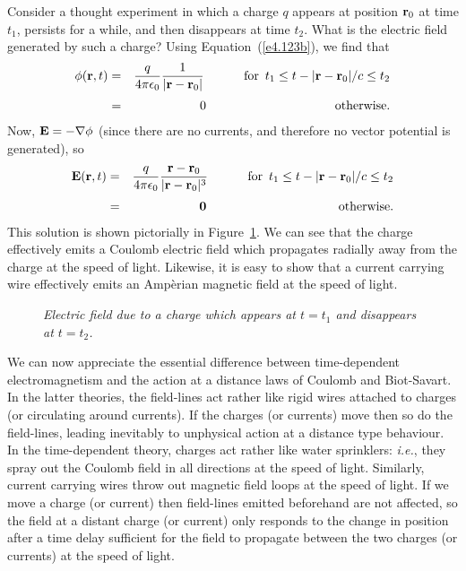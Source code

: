 Consider a thought experiment in which a charge $q$ appears at position ${\bf r}_0$ at time
$t_1$, persists for a while, and then disappears at time $t_2$. What is the electric field
generated by such a charge? Using Equation~(\ref{e4.123b}), we find that
\begin{eqnarray}
\phi({\bf r},t) &=& \frac{q}{4\pi \epsilon_0} \frac{1}{|{\bf r} - {\bf r}_0|}
\mbox{\hspace{1cm} for\, $ t_1\leq t-|{\bf r} - {\bf r}_0|/c \leq t_2$}\nonumber
\\[0.5ex] &=& 0 \mbox{\hspace{3.5cm} otherwise}.
\end{eqnarray}
Now, ${\bf E} = - \nabla \phi$ (since there are no currents, and therefore no vector potential
is generated), so
\begin{eqnarray}
{\bf E}({\bf r},t) &=& \frac{q}{4\pi\epsilon_0} \frac{{\bf r} - {\bf r}_0}{|{\bf r} - {\bf r}_0|^3}
\mbox{\hspace{1cm} for \,$ t_1\leq t-|{\bf r} - {\bf r}_0|/c \leq t_2$}\nonumber\\[0.5ex] 
 &=& {\bf 0} \mbox{\hspace{3.6cm} otherwise}.
\end{eqnarray}
This solution is shown pictorially in Figure~\ref{f36}. We can see that the charge effectively emits
a Coulomb electric field which propagates radially away from the charge at the speed of
light. Likewise, it is easy to show that a current carrying wire effectively emits an Amp\`{e}rian
magnetic field at the speed of light.
\begin{figure}
\centerline{}
\caption{\em Electric field due to a charge which appears at $t=t_1$ and
disappears at $t=t_2$.}\label{f36}
\end{figure}

We can now appreciate the essential difference between time-dependent electromagnetism and
the action at a distance laws of Coulomb and Biot-Savart. In the latter
theories, the field-lines act
rather like rigid 
 wires attached to charges (or circulating around currents). If the charges (or currents) move then
so do the field-lines, leading inevitably to unphysical action at a distance type behaviour. 
In the time-dependent theory, charges act rather like water sprinklers: {\em i.e.}, they spray out the
Coulomb field in all directions at the speed of light. Similarly,
current carrying  wires throw out magnetic field
loops at the speed of light. If we move a charge (or current) then field-lines emitted beforehand
are not affected, so the field at a distant charge (or current) only responds to the change 
in position 
after a time delay sufficient for the field to propagate between the two charges (or currents) at
the speed of light. 

